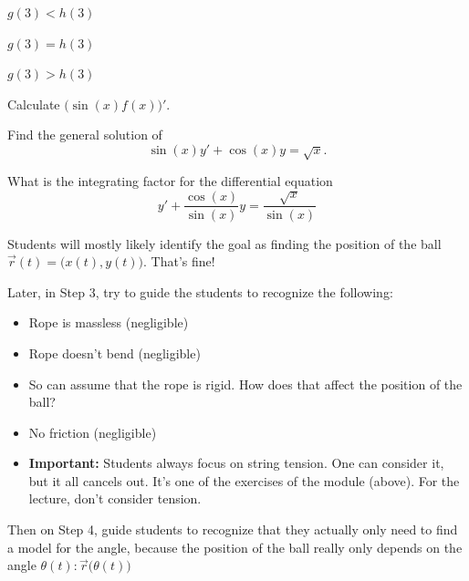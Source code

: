 \begin{parts}
\begin{enumerate}[label={\bf (\alph*)}]
\hfil 
\begin{minipage}{.2\textwidth}
\item $g(3) < h(3)$
\end{minipage}
\hfil
\begin{minipage}{.2\textwidth}
\item $g(3) = h(3)$
\end{minipage}
\hfil
\begin{minipage}{.2\textwidth}
\item $g(3) > h(3)$
\end{minipage}
\end{enumerate}

\end{parts}




\bookonlynewpage



\question
\begin{parts}
	\item Calculate $\big( \sin(x) f(x) \big)'$.
	\item Find the general solution of 
		$$ \sin(x) y' + \cos(x) y = \sqrt{x}.$$
	\item What is the integrating factor for the differential equation
		$$ y' + \frac{\cos(x)}{\sin(x)} y = \frac{\sqrt{x}}{\sin(x)}$$
\end{parts}




\begin{annotation}
	\begin{Goals}
		Students will mostly likely identify the goal as finding the position of the ball $\vec{r}(t) = \big( x(t) , y(t) \big)$. That's fine!
		
		Later, in Step 3, try to guide the students to recognize the following:
		\begin{itemize}
			\item Rope is massless (negligible)
			\item Rope doesn't bend (negligible)
			\item So can assume that the rope is rigid. How does that affect the position of the ball?
			\item No friction (negligible)
			\item \textbf{Important:} Students always focus on string tension. One can consider it, but it all cancels out. It's one of the exercises of the module (above). For the lecture, don't consider tension.
		\end{itemize}
		
		Then on Step 4, guide students to recognize that they actually only need to find a model for the angle, because the position of the ball really only depends on the angle $\theta(t): \vec{r}\big(\theta(t)\big)$
				
	\end{Goals}
\end{annotation}







